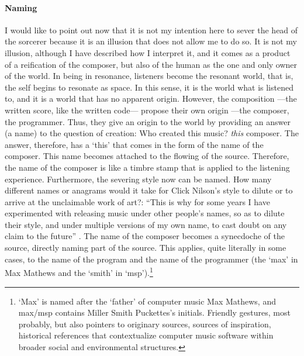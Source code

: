 \paragraph{Naming}
I would like to point out now that it is not my intention here to sever the head of the sorcerer because it is an illusion that does not allow me to do so. It is not my illusion, although I have described how I interpret it, and it comes as a product of a reification of the composer, but also of the human as the one and only owner of the world. In being in resonance, listeners become the resonant world, that is, the self begins to resonate as space. In this sense, it is the world what is listened to, and it is a world that has no apparent origin. However, the composition ---the written score, like the written code--- propose their own origin ---the composer, the programmer. Thus, they give an origin to the world by providing an answer (a name) to the question of creation: Who created this music? \textit{this} composer. The answer, therefore, has a `this' that comes in the form of the name of the composer. This name becomes attached to the flowing of the source. Therefore, the name of the composer is like a timbre stamp that is applied to the listening experience. Furthermore, the severing style now can be named. How many different names or anagrams would it take for Click Nilson's style to dilute or to arrive at the unclaimable work of art?: ``This is why for some years I have experimented with releasing music under other people's names, so as to dilute their style, and under multiple versions of my own name, to cast doubt on any claim to the future'' \parencite{Col15:Col}. The name of the composer becomes a synecdoche of the source, directly naming part of the source. This applies, quite literally in some cases, to the name of the program and the name of the programmer (the `max' in Max Mathews and the `smith' in `msp').\footnote{`Max' is named after the `father' of computer music Max Mathews, and \gls{max/msp} contains Miller Smith Puckettes's initials. Friendly gestures, most probably, but also pointers to originary sources, sources of inspiration, historical references that contextualize computer music software within broader social and environmental structures.}

